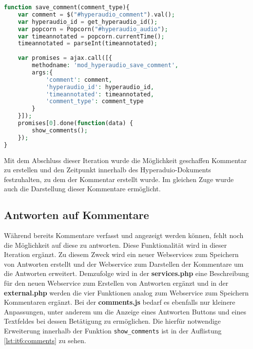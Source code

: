 \begin{lstlisting}[language=php,
             linewidth=\textwidth,
             caption={Ausschnitt der \textbf{comments.js} in der 5. Iteration},
             label={lst:it5:comments}]
function save_comment(comment_type){
	var comment = $("#hyperaudio_comment").val();
	var hyperaudio_id = get_hyperaudio_id();
	var popcorn = Popcorn("#hyperaudio_audio");
	var timeannotated = popcorn.currentTime();
	timeannotated = parseInt(timeannotated);
	    
	var promises = ajax.call([{
		methodname: 'mod_hyperaudio_save_comment',
		args:{
			'comment': comment,
			'hyperaudio_id': hyperaudio_id,       
			'timeannotated': timeannotated,
			'comment_type': comment_type
		}
	}]);
	promises[0].done(function(data) {
		show_comments();
	});
}
\end{lstlisting}


Mit dem Abschluss dieser Iteration wurde die Möglichkeit geschaffen Kommentar zu erstellen und den Zeitpunkt innerhalb des Hyperaduio-Dokuments festzuhalten, zu dem der Kommentar erstellt wurde. Im gleichen Zuge wurde auch die Darstellung dieser Kommentare ermöglicht.

\subsection{Antworten auf Kommentare}
Während bereits Kommentare verfasst und angezeigt werden können, fehlt noch die Möglichkeit auf diese zu antworten. Diese Funktionalität wird in dieser Iteration ergänzt. Zu diesem Zweck wird ein neuer Webservices zum Speichern von Antworten erstellt und der Webservice zum Darstellen der Kommentare um die Antworten erweitert. Demzufolge wird in der \textbf{services.php} eine Beschreibung für den neuen Webservice zum Erstellen von Antworten ergänzt und in der \textbf{external.php} werden die vier Funktionen analog zum Webservice zum Speichern Kommentaren ergänzt. Bei der \textbf{comments.js} bedarf es ebenfalls nur kleinere Anpassungen, unter anderem um die Anzeige eines Antworten Buttons und eines Textfeldes bei dessen Betätigung zu ermöglichen. Die hierfür notwendige Erweiterung innerhalb der Funktion \texttt{show_comments} ist in der Auflistung \ref{lst:it6:comments} zu sehen.

